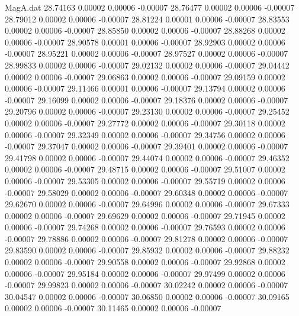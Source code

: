 \begin{filecontents}{MagA.dat}
  28.74163    0.00002    0.00006   -0.00007
  28.76477    0.00002    0.00006   -0.00007
  28.79012    0.00002    0.00006   -0.00007
  28.81224    0.00001    0.00006   -0.00007
  28.83553    0.00002    0.00006   -0.00007
  28.85850    0.00002    0.00006   -0.00007
  28.88268    0.00002    0.00006   -0.00007
  28.90578    0.00001    0.00006   -0.00007
  28.92903    0.00002    0.00006   -0.00007
  28.95221    0.00002    0.00006   -0.00007
  28.97527    0.00002    0.00006   -0.00007
  28.99833    0.00002    0.00006   -0.00007
  29.02132    0.00002    0.00006   -0.00007
  29.04442    0.00002    0.00006   -0.00007
  29.06863    0.00002    0.00006   -0.00007
  29.09159    0.00002    0.00006   -0.00007
  29.11466    0.00001    0.00006   -0.00007
  29.13794    0.00002    0.00006   -0.00007
  29.16099    0.00002    0.00006   -0.00007
  29.18376    0.00002    0.00006   -0.00007
  29.20796    0.00002    0.00006   -0.00007
  29.23130    0.00002    0.00006   -0.00007
  29.25452    0.00002    0.00006   -0.00007
  29.27772    0.00002    0.00006   -0.00007
  29.30118    0.00002    0.00006   -0.00007
  29.32349    0.00002    0.00006   -0.00007
  29.34756    0.00002    0.00006   -0.00007
  29.37047    0.00002    0.00006   -0.00007
  29.39401    0.00002    0.00006   -0.00007
  29.41798    0.00002    0.00006   -0.00007
  29.44074    0.00002    0.00006   -0.00007
  29.46352    0.00002    0.00006   -0.00007
  29.48715    0.00002    0.00006   -0.00007
  29.51007    0.00002    0.00006   -0.00007
  29.53305    0.00002    0.00006   -0.00007
  29.55719    0.00002    0.00006   -0.00007
  29.58029    0.00002    0.00006   -0.00007
  29.60348    0.00002    0.00006   -0.00007
  29.62670    0.00002    0.00006   -0.00007
  29.64996    0.00002    0.00006   -0.00007
  29.67333    0.00002    0.00006   -0.00007
  29.69629    0.00002    0.00006   -0.00007
  29.71945    0.00002    0.00006   -0.00007
  29.74268    0.00002    0.00006   -0.00007
  29.76593    0.00002    0.00006   -0.00007
  29.78886    0.00002    0.00006   -0.00007
  29.81278    0.00002    0.00006   -0.00007
  29.83590    0.00002    0.00006   -0.00007
  29.85932    0.00002    0.00006   -0.00007
  29.88232    0.00002    0.00006   -0.00007
  29.90558    0.00002    0.00006   -0.00007
  29.92868    0.00002    0.00006   -0.00007
  29.95184    0.00002    0.00006   -0.00007
  29.97499    0.00002    0.00006   -0.00007
  29.99823    0.00002    0.00006   -0.00007
  30.02242    0.00002    0.00006   -0.00007
  30.04547    0.00002    0.00006   -0.00007
  30.06850    0.00002    0.00006   -0.00007
  30.09165    0.00002    0.00006   -0.00007
  30.11465    0.00002    0.00006   -0.00007

\end{filecontents}

